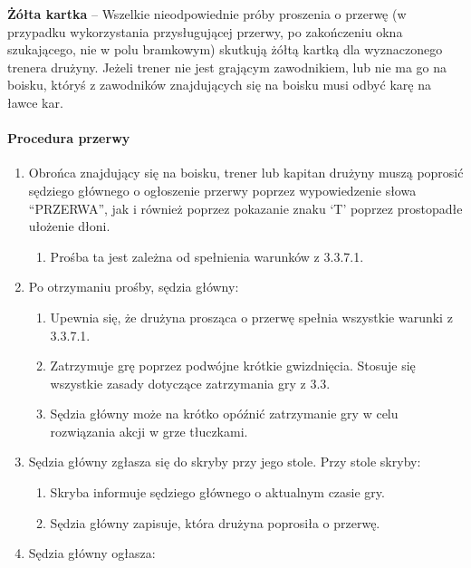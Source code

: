 \documentclass[12pt]{article}
\newcommand\yellowcard[1]{\bgroup\textcolor{darkyellow}{\textbf{#1}}}
\begin{document}
\yellowcard{Żółta kartka} -- Wszelkie nieodpowiednie próby proszenia o przerwę
(w przypadku wykorzystania przysługującej przerwy, po zakończeniu okna
szukającego, nie w polu bramkowym) skutkują żółtą kartką dla
wyznaczonego trenera drużyny. Jeżeli trener nie jest grającym
zawodnikiem, lub nie ma go na boisku, któryś z zawodników znajdujących
się na boisku musi odbyć karę na ławce kar.

\paragraph{Procedura przerwy}

\begin{enumerate}
	\item
	      Obrońca znajdujący się na boisku, trener lub kapitan drużyny muszą
	      poprosić sędziego głównego o ogłoszenie przerwy poprzez wypowiedzenie
	      słowa ``PRZERWA'', jak i również poprzez pokazanie znaku `T' poprzez
	      prostopadłe ułożenie dłoni.

	      \begin{enumerate}
		      \item
		            Prośba ta jest zależna od spełnienia warunków z 3.3.7.1.
	      \end{enumerate}
	\item
	      Po otrzymaniu prośby, sędzia główny:

	      \begin{enumerate}
		      \item
		            Upewnia się, że drużyna prosząca o przerwę spełnia wszystkie warunki
		            z 3.3.7.1.
		      \item
		            Zatrzymuje grę poprzez podwójne krótkie gwizdnięcia. Stosuje się
		            wszystkie zasady dotyczące zatrzymania gry z 3.3.
		      \item
		            Sędzia główny może na krótko opóźnić zatrzymanie gry w celu
		            rozwiązania akcji w grze tłuczkami.
	      \end{enumerate}
	\item
	      Sędzia główny zgłasza się do skryby przy jego stole. Przy stole
	      skryby:

	      \begin{enumerate}
		      \item
		            Skryba informuje sędziego głównego o aktualnym czasie gry.
		      \item
		            Sędzia główny zapisuje, która drużyna poprosiła o przerwę.
	      \end{enumerate}
	\item
	      Sędzia główny ogłasza:


\end{enumerate}
\end{document}
